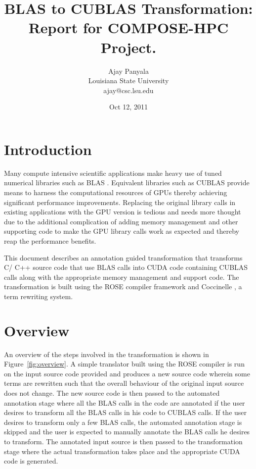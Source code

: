 \documentclass[12pt,a4paper]{article}
\title{BLAS to CUBLAS Transformation:\\
		Report for COMPOSE-HPC Project.}
\author{Ajay Panyala \\[1.8ex]
Louisiana State University\\[1.8ex]
ajay@csc.lsu.edu}
\date{Oct 12, 2011}
\begin{document}
\maketitle
\section{Introduction}
Many compute intensive scientific applications make heavy use of tuned numerical 
libraries such as BLAS \cite{BLAS}. Equivalent libraries such as CUBLAS \cite{CUBLAS} provide means to harness the computational resources of GPUs thereby achieving significant performance improvements.  Replacing the original library calls in existing applications with the GPU version is tedious and needs more thought due to the additional complication of adding memory management and other supporting code to make the GPU library calls work as expected and thereby reap the performance benefits.

This document describes an annotation guided transformation that transforms C/ C++ 
source code that use BLAS calls into CUDA code containing CUBLAS calls along
with the appropriate memory management and support code. The transformation
is built using the ROSE compiler framework \cite{ROSE} and Coccinelle \cite{Coccinelle},
a term rewriting system.

\section{Overview}
An overview of the steps involved in the transformation is shown
in Figure~\ref{fig:overview}. A simple translator built using the
ROSE compiler is run on the input source code provided and produces
a new source code wherein some terms are rewritten such that 
the overall behaviour of the original input source does not change. 
The new source code is then passed to the automated annotation stage
where all the BLAS calls in the code are annotated if the user desires to 
transform all the BLAS calls in his code to CUBLAS calls. If the user desires
to transform only a few BLAS calls, the automated annotation stage is skipped and 
the user is expected to manually annotate the BLAS calls he desires to transform. 
The annotated input source is then passed to the transformation stage 
where the actual transformation takes place and the appropriate CUDA 
code is generated.
\end{document}

